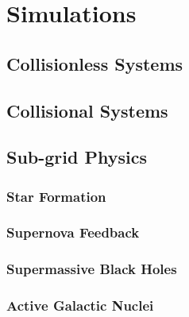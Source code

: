 
\section{Simulations}
\label{sec:simulations}



\subsection{Collisionless Systems}



\subsection{Collisional Systems}



\subsection{Sub-grid Physics}


\subsubsection{Star Formation}


\subsubsection{Supernova Feedback}


\subsubsection{Supermassive Black Holes}


\subsubsection{Active Galactic Nuclei}



